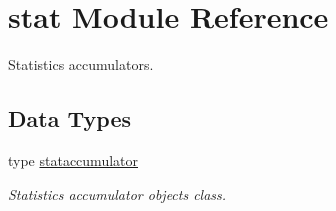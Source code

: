\hypertarget{namespacestat}{}\section{stat Module Reference}
\label{namespacestat}


Statistics accumulators.  


\subsection*{Data Types}
\begin{DoxyCompactItemize}
\item 
type \hyperlink{structstat_1_1stataccumulator}{stataccumulator}
\begin{DoxyCompactList}\small\item\em Statistics accumulator objects class. \end{DoxyCompactList}\end{DoxyCompactItemize}
